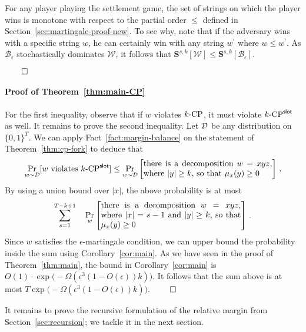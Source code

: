 For any player playing the settlement game, 
the set of strings on which the player wins is monotone 
with respect to the partial order $\leq$ defined in Section~\ref{sec:martingale-proof-new}. 
To see why, note that if the adversary wins with a specific string $w$, 
he can certainly win with any string $w^\prime$ where $w \leq w^\prime$. 
As $\mathcal{B}_\epsilon$ stochastically dominates $\mathcal{W}$, it follows that 
$
  \mathbf{S}^{s,k}[\mathcal{W}] \leq \mathbf{S}^{s,k}[\mathcal{B}_\epsilon]
$.

\hfill$\qed$


\paragraph{Proof of Theorem~\ref{thm:main-CP}}
For the first inequality, observe that if $w$ violates ${k}\text{-}\mathrm{CP}$, it must violate ${k}\text{-}\mathrm{CP}^{\mathsf{slot}}$ as well. 
It remains to prove the second inequality. 
Let $\mathcal{D}$ be any distribution on $\{0,1\}^T$. 
We can apply Fact~\ref{fact:margin-balance} on the statement of Theorem~\ref{thm:cp-fork} 
to deduce that 
\begin{equation*}\label{eq:main-argument-1}
  \Pr_{w \sim \Distribution}[\text{$w$ violates $\kSlotCP$}] 
    \leq 
    \Pr_{w \sim \Distribution}\left[\parbox{55mm}{
      there is a decomposition $w = xyz$, 
      where $|y| \geq k$, 
      so that $\mu_x(y) \geq 0$ 
    } \right] 
    \,.
\end{equation*}
By using a union bound over $|x|$, the above probability is at most 
\[
    \sum_{s = 1}^{T - k + 1} 
    \quad 
      \Pr_w\left[\parbox{60mm}{
        there is a decomposition $w = xyz$, 
        where $|x| = s - 1$ and $|y| \geq k$, 
        so that $\mu_x(y) \geq 0$ 
      }\right] 
    \,.
\]
Since $w$ satisfies the $\epsilon$-martingale condition, 
we can upper bound the probability inside the sum 
using Corollary~\ref{cor:main}. 
As we have seen in the proof of Theorem~\ref{thm:main}, 
the bound in Corollary~\ref{cor:main} is 
$
  O(1) \cdot \exp\bigl(-\Omega(\epsilon^3 (1 - O(\epsilon))k)\bigr)
$.
It follows that the sum above is at most $T \exp\bigl(-\Omega(\epsilon^3 (1 - O(\epsilon))k)\bigr)$.
\hfill $\qed$


It remains to prove the recursive formulation of the relative margin 
from Section~\ref{sec:recursion}; 
we tackle it in the next section.



